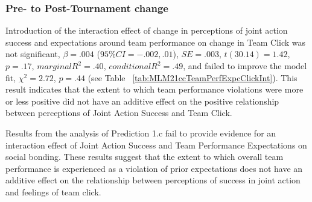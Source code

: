   \subsubsection{Pre- to Post-Tournament change}
  Introduction of the interaction effect of change in perceptions of joint action success and expectations around team performance on change in Team Click was not significant, $\beta = .004$ ($95\% CI =  -.002, .01$), $SE = .003$, $t(30.14) = 1.42$, $p = .17$, $marginal R^2 = .40$, $conditional R^2 = .49$, and failed to improve the model fit, $\chi^2 = 2.72$, $ p = .44$ (see Table ~\ref{tab:MLM21ccTeamPerfExpcClickInt}).  This result indicates that the extent to which team performance violations were more or less positive did not have an additive effect on the positive relationship between perceptions of Joint Action Success and Team Click.

  


Results from the analysis of Prediction 1.c fail to provide evidence for an interaction effect of Joint Action Success and Team Performance Expectations on social bonding.  These results suggest that the extent to which overall team performance is experienced as a violation of prior expectations does not have an additive effect on the relationship between perceptions of success in joint action and feelings of team click.

















